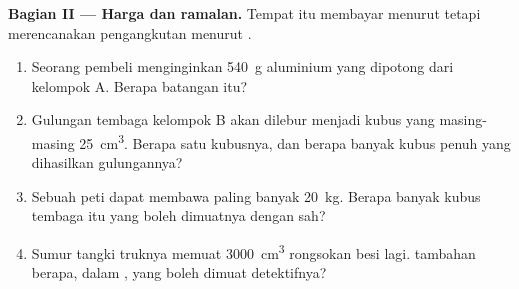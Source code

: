 \begin{problem}
\medskip\noindent\textbf{Bagian II --- Harga dan ramalan.}
Tempat itu membayar menurut  tetapi merencanakan pengangkutan
menurut .
\begin{enumerate}[resume]
  \item Seorang pembeli menginginkan \qty{540}{g} aluminium yang
        dipotong dari kelompok A. Berapa  batangan itu?
  \item Gulungan tembaga kelompok B akan dilebur menjadi kubus yang
        masing-masing \qty{25}{cm^3}. Berapa  satu kubusnya, dan
        berapa banyak kubus penuh yang dihasilkan gulungannya?
  \item Sebuah peti dapat membawa paling banyak \qty{20}{kg}. Berapa
        banyak kubus tembaga itu yang boleh dimuatnya dengan sah?
  \item Sumur tangki truknya memuat \qty{3000}{cm^3} rongsokan besi
        lagi.  tambahan berapa, dalam , yang boleh dimuat
        detektifnya?
\end{enumerate}


\end{problem}
